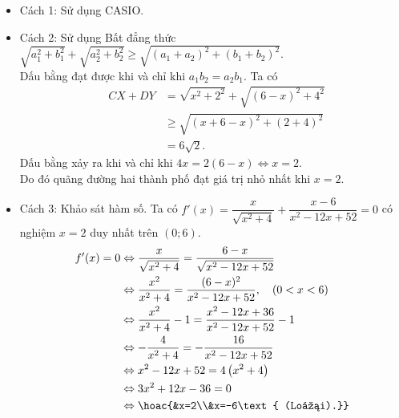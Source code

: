 \begin{bt}
{\begin{itemize}
		\item Cách 1: Sử dụng CASIO.
		\item Cách 2: Sử dụng Bất đẳng thức $\sqrt{a_1^2+b_1^2}+\sqrt{a_2^2+b_2^2}\ge \sqrt{(a_1+a_2)^2+(b_1+b_2)^2}$.\\
		Dấu bằng đạt được khi và chỉ khi $a_1b_2=a_2b_1$. Ta có
		 \begin{eqnarray*}
			&CX+DY&=\sqrt{x^2+2^2}+\sqrt{(6-x)^2+4^2}\\
			&&\ge \sqrt{(x+6-x)^2+(2+4)^2}\\
			&&=6\sqrt{2}.
		\end{eqnarray*}
		Dấu bằng xảy ra khi và chỉ khi $4x=2(6-x)\Leftrightarrow x=2$.\\
		Do đó quãng đường hai thành phố đạt giá trị nhỏ nhất khi $x=2$.
		\item Cách 3: Khảo sát hàm số. Ta có $f'(x)=\dfrac{x}{\sqrt{x^2+4}}+\dfrac{x-6}{x^2-12x+52}=0$ có nghiệm $x=2$ duy nhất trên $(0;6)$.
		\[\begin{aligned}
			f'(x)=0 & \Leftrightarrow \dfrac{x}{\sqrt{x^2+4}}=\dfrac{6-x}{\sqrt{x^2-12 x+52}} \\
			& \Leftrightarrow \dfrac{x^2}{x^2+4}=\dfrac{(6-x)^2}{x^2-12 x+52}, \quad(0<x<6) \\
			& \Leftrightarrow \dfrac{x^2}{x^2+4}-1=\dfrac{x^2-12 x+36}{x^2-12 x+52}-1 \\
			& \Leftrightarrow-\dfrac{4}{x^2+4}=-\dfrac{16}{x^2-12 x+52} \\
			& \Leftrightarrow x^2-12 x+52=4\left(x^2+4\right) \\
			& \Leftrightarrow 3 x^2+12 x-36=0 \\
			& \Leftrightarrow\hoac{&x=2\\&x=-6\text{ (Loại).}}
		\end{aligned}\]
	\end{itemize}
	}
\end{bt}

